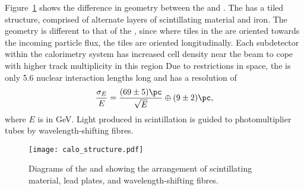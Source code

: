 Figure~\ref{fig:lhcb:calo} shows the difference in geometry between the \ecal and \hcal.
The \hcal has a tiled structure, comprised of alternate layers of scintillating material and iron.
The geometry is different to that of the \ecal, since where tiles in the \ecal are oriented
towards the incoming particle flux, the \hcal tiles are oriented longitudinally.
Each subdetector within the calorimetry system has increased cell density near the beam to cope
with higher track multiplicity in this region
Due to restrictions in space, the \hcal is only 5.6 nuclear interaction lengths long and has a
resolution of
\begin{equation}
  \frac{\sigma_E}{E} = \frac{(69\pm5)\pc}{\sqrt{E}} \oplus (9\pm2)\pc,
\end{equation}
where $E$ is in GeV.
Light produced in scintillation is guided to photomultiplier tubes by wavelength-shifting fibres.

\begin{figure}
  \begin{center}
    \texttt{[image: calo\_structure.pdf]}
    \caption[Diagram of the LHCb hadron and electron calorimeters]
    {
      Diagrams of the \lhcb \hcal and \ecal showing the arrangement of scintillating material,
      lead plates, and wavelength-shifting fibres.
    }
    \label{fig:lhcb:calo}
  \end{center}
\end{figure}


